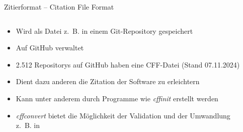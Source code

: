 \documentclass[%
    handout,
    aspectratio=1610,
    10pt,
    onlytextwidth, %
]{beamer}
\begin{document}
\begin{frame}{Zitierformat – Citation File Format}
    \begin{columns}
        \begin{column}[t]{0.49\textwidth}
            \justifying
            \begin{itemize}
                \item Wird als Datei z.~B. in einem Git-Repository gespeichert
                \item Auf GitHub \href{https://github.com/citation-file-format}{\color{black}{\faGithub}} verwaltet
                \item 2.512 Repositorys auf GitHub haben eine CFF-Datei (Stand 07.11.2024)
                \item Dient dazu anderen die Zitation der Software zu erleichtern
                \item Kann unter anderem durch Programme wie \emph{cffinit} erstellt werden \autocite{spaaks_cffinit_2023}
                \item \emph{cffconvert} bietet die Möglichkeit der Validation und der Umwandlung z.~B. in  \autocite{spaaks_cffconvert_2021}
            \end{itemize}
        \end{column}
        \begin{column}[t]{0.49\textwidth}
            \justifying
            \inputminted[fontsize=\scriptsize]{yaml}{./CITATION_small.cff}
        \end{column}
    \end{columns}
\end{frame}
\end{document}
